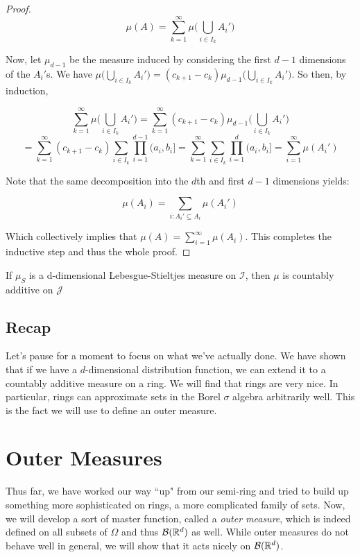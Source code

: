 \begin{proof}
   \[ \mu(A) = \sum_{k=1}^\infty \mu\bigg(\bigcup_{i \in I_k}A_i'\bigg) \]
   
   Now, let $\mu_{d-1}$ be the measure induced by considering the first $d-1$ dimensions of 
   the $A_i'$s. We have $\mu\bigg(\bigcup_{i \in I_k}A_i'\bigg) = (c_{k+1} - c_k) \mu_{d-1}\bigg(\bigcup_{i \in I_k}A_i'\bigg)$. 
   So then, by induction, 

   \[ \sum_{k=1}^\infty \mu\bigg(\bigcup_{i \in I_k}A_i'\bigg)  =  \sum_{k=1}^\infty  (c_{k+1} - c_k) \mu_{d-1}\bigg(\bigcup_{i \in I_k}A_i'\bigg)\]
   \[ = \sum_{k=1}^\infty  (c_{k+1} - c_k) \sum_{i \in I_k}\prod_{i=1}^{d-1} (a_i, b_i]  = \sum_{k=1}^\infty \sum_{i \in I_k}\prod_{i=1}^{d} (a_i, b_i] = \sum_{i=1}^\infty \mu(A_i') \] 

   Note that the same decomposition into the $d$th and first $d-1$ dimensions yields: 

   \[ \mu(A_i) = \sum_{i : A_i' \subseteq A_i} \mu(A_i') \]

   Which collectively implies that $\mu(A) = \sum_{i=1}^\infty \mu(A_i)$. This completes the inductive step and thus the whole proof.

\end{proof}

\begin{corollary}\label{cor:countably_additive_on_ring}
   If $\mu_S$ is a d-dimensional Lebesgue-Stieltjes measure on $\mathcal I$, 
   then $\mu$ is countably additive on $\mathcal J$
\end{corollary}

\subsection{Recap}

Let's pause for a moment to focus on what we've actually done. We have shown that 
if we have a $d$-dimensional distribution function, we can extend it to a 
countably additive measure on a ring. We will find that rings are very nice. In particular, 
rings can approximate sets in the Borel $\sigma$ algebra arbitrarily well. This is the fact 
we will use to define an outer measure.

\section{Outer Measures}

Thus far, we have worked our way ``up" from our semi-ring and tried to 
build up something more sophisticated on rings, a more complicated family of sets. 
Now, we will develop a sort of master function, called a \emph{outer measure}, which 
is indeed defined on all subsets of $\Omega$ and thus $\mathcal B(\mathbb R^d)$ as well. 
While outer measures do not behave well in general, we will show that it acts 
nicely on $\mathcal B(\mathbb R^d)$.\\ 

